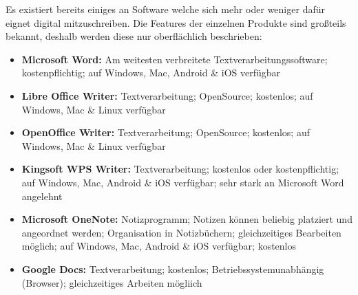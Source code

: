 
Es existiert bereits einiges an Software welche sich mehr oder weniger dafür eignet digital mitzuschreiben. Die Features der einzelnen Produkte sind großteils bekannt, deshalb werden diese nur oberflächlich beschrieben:

\begin{itemize}
\item \textbf{Microsoft Word:} Am weitesten verbreitete Textverarbeitungssoftware; kostenpflichtig; auf Windows, Mac, Android \& iOS verfügbar
\item \textbf{Libre Office Writer:} Textverarbeitung; OpenSource; kostenlos; auf Windows, Mac \& Linux verfügbar
\item \textbf{OpenOffice Writer:} Textverarbeitung; OpenSource; kostenlos; auf Windows, Mac \& Linux verfügbar
\item \textbf{Kingsoft WPS Writer:} Textverarbeitung; kostenlos oder kostenpflichtig; auf Windows, Mac, Android \& iOS verfügbar; sehr stark an Microsoft Word angelehnt
\item \textbf{Microsoft OneNote:} Notizprogramm; Notizen können beliebig platziert und angeordnet werden; Organisation in Notizbüchern; gleichzeitiges Bearbeiten möglich; auf Windows, Mac, Android \& iOS verfügbar; kostenlos
\item \textbf{Google Docs:} Textverarbeitung; kostenlos; Betriebssystemunabhängig (Browser); gleichzeitiges Arbeiten mögliich
\end{itemize}
